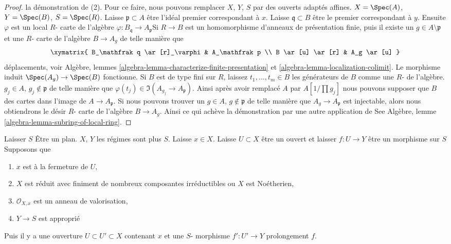 \begin{proof}
la démonstration de (2). Pour ce faire, nous pouvons remplacer $X$, $Y$, $S$ par des ouverts adaptés affines. $X = \Spec(A)$, $Y = \Spec(B)$, $S = \Spec(R)$. Laisse $\mathfrak p \subset A$ être l'idéal premier correspondant à $x$. Laisse $\mathfrak q \subset B$ être le premier correspondant à $y$. Ensuite $\varphi$ est un local $R$- carte de l'algèbre
$\varphi : B_\mathfrak q \to A_\mathfrak p$Si $R \to B$ est un homomorphisme d'anneaux de présentation finie, puis il existe un
$g \in A \setminus \mathfrak p$ et une $R$- carte de l'algèbre $B \to A_g$ de telle manière que
$$
\xymatrix{
B_\mathfrak q \ar[r]_\varphi & A_\mathfrak p \\
B \ar[u] \ar[r] & A_g \ar[u]
}
$$
déplacements, voir Algèbre, lemmes \ref{algebra-lemma-characterize-finite-presentation} et
\ref{algebra-lemma-localization-colimit}. Le morphisme induit $\Spec(A_g) \to \Spec(B)$ fonctionne. Si $B$ est de type fini sur $R$, laissez $t_1, \ldots, t_m \in B$ les générateurs de $B$ comme une $R$- de l'algèbre.
$g_j \in A$, $g_j \not \in \mathfrak p$
de telle manière que $\varphi(t_j) \in \Im(A_{g_j} \to A_\mathfrak p)$. Ainsi après avoir remplacé $A$ par $A[1/\prod g_j]$ nous pouvons supposer que $B$ des cartes dans l'image de $A \to A_\mathfrak p$. Si nous pouvons trouver un $g \in A$, $g \not \in \mathfrak p$
de telle manière que $A_g \to A_\mathfrak p$ est injectable, alors nous obtiendrons le désir $R$- carte de l'algèbre $B \to A_g$. Ainsi ce qui achève la démonstration par une autre application de See Algèbre, lemme \ref{algebra-lemma-subring-of-local-ring}.

\end{proof}

\begin{lemma}

\label{lemma-extend-across}

Laisser $S$ Être un plan. $X$, $Y$ les régimes sont plus $S$. Laisse $x \in X$. Laisse $U \subset X$ être un ouvert et laisser $f : U \to Y$ être un morphisme sur $S$Supposons que

\begin{enumerate}

\item  $x$ est à la fermeture de $U$,
\item  $X$ est réduit avec finiment de nombreux composantes irréductibles ou
$X$ est Noétherien,
\item  $\mathcal{O}_{X, x}$ est un anneau de valorisation,
\item  $Y \to S$ est approprié

\end{enumerate}

Puis il y a une ouverture $U \subset U' \subset X$ contenant
$x$ et une $S$- morphisme $f' : U' \to Y$ prolongement $f$.

\end{lemma}

